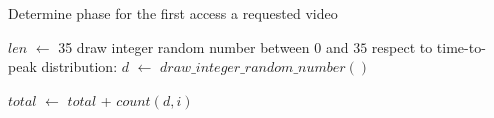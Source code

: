 \begin{algorithm}
\caption{Determine phase for the first access a requested video}
\label{alg3}
\begin{algorithmic}[1]

\STATE $len$ $\leftarrow$ 35 
\STATE draw integer random number between $0$ and $35$ respect to time-to-peak distribution: 
$d$ $\leftarrow$ $draw\_integer\_random\_number()$
\ENDFOR

\STATE $total$ $\leftarrow$ $total$ + $count(d,i)$ 
\ENDFOR
{}
\ELSE
{}
\ENDIF
\end{algorithmic}
\end{algorithm}




